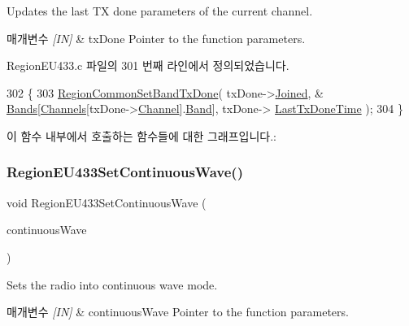 Updates the last TX done parameters of the current channel. 


\begin{DoxyParams}{매개변수}
{\em \mbox{[}\+I\+N\mbox{]}} & tx\+Done Pointer to the function parameters. \\
\hline
\end{DoxyParams}


Region\+E\+U433.\+c 파일의 301 번째 라인에서 정의되었습니다.


\begin{DoxyCode}
302 \{
303     \mbox{\hyperlink{group___r_e_g_i_o_n_c_o_m_m_o_n_ga491dea5590228a0cd33affd71743779c}{RegionCommonSetBandTxDone}}( txDone->\mbox{\hyperlink{structs_set_band_tx_done_params_ac2f6caa0f3b02d2ac5056c3ee7c22652}{Joined}}, &
      \mbox{\hyperlink{_region_e_u433_8c_a6c5b6e34893684b2def82b051e03096b}{Bands}}[\mbox{\hyperlink{_region_e_u433_8c_a989ac3355f1ed5b534b3940af3deeb14}{Channels}}[txDone->\mbox{\hyperlink{structs_set_band_tx_done_params_a1ca6f01ca18afe402de51babe8c95f5e}{Channel}}].\mbox{\hyperlink{structs_channel_params_a724c03aa06953111c3291243831f251b}{Band}}], txDone->
      \mbox{\hyperlink{structs_set_band_tx_done_params_a7316dfb002c4e0015fceeb727020fe5c}{LastTxDoneTime}} );
304 \}
\end{DoxyCode}
이 함수 내부에서 호출하는 함수들에 대한 그래프입니다.\+:
\mbox{\label{group___r_e_g_i_o_n_e_u433_ga76561de6c45317a54ded972f7ac80836}} 
\subsubsection{\texorpdfstring{Region\+E\+U433\+Set\+Continuous\+Wave()}{RegionEU433SetContinuousWave()}}
{\footnotesize\ttfamily void Region\+E\+U433\+Set\+Continuous\+Wave (\begin{DoxyParamCaption}\item[{\mbox{\hyperlink{group___r_e_g_i_o_n_gaf39bb5ba06921139c6d17f88a8d518cd}{Continuous\+Wave\+Params\+\_\+t}} $\ast$}]{continuous\+Wave }\end{DoxyParamCaption})}



Sets the radio into continuous wave mode. 


\begin{DoxyParams}{매개변수}
{\em \mbox{[}\+I\+N\mbox{]}} & continuous\+Wave Pointer to the function parameters. \\
\hline
\end{DoxyParams}


